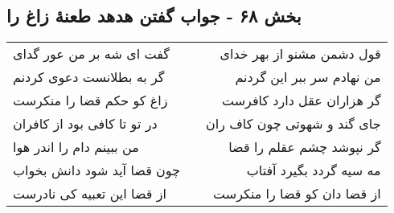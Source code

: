 \begin{center}
\section*{بخش ۶۸ - جواب گفتن هدهد طعنهٔ زاغ را}
\label{sec:sh068}
\begin{longtable}{l p{0.5cm} r}
گفت ای شه بر من عور گدای
&&
قول دشمن مشنو از بهر خدای
\\
گر به بطلانست دعوی کردنم
&&
من نهادم سر ببر این گردنم
\\
زاغ کو حکم قضا را منکرست
&&
گر هزاران عقل دارد کافرست
\\
در تو تا کافی بود از کافران
&&
جای گند و شهوتی چون کاف ران
\\
من ببینم دام را اندر هوا
&&
گر نپوشد چشم عقلم را قضا
\\
چون قضا آید شود دانش بخواب
&&
مه سیه گردد بگیرد آفتاب
\\
از قضا این تعبیه کی نادرست
&&
از قضا دان کو قضا را منکرست
\\
\end{longtable}
\end{center}
